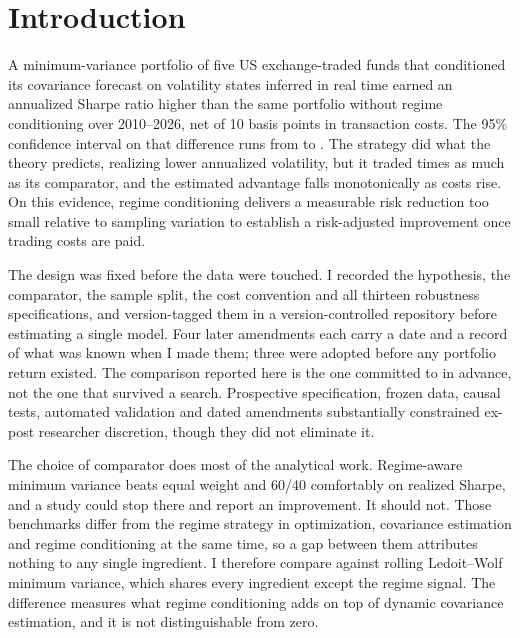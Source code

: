 \section{Introduction}
\label{sec:introduction}

A minimum-variance portfolio of five US exchange-traded funds that
conditioned its covariance forecast on volatility states inferred in
real time earned an annualized Sharpe ratio \primarySharpeDiff{} higher
than the same portfolio without regime conditioning over 2010--2026, net
of 10 basis points in transaction costs. The 95\% confidence interval on
that difference runs from \primaryCiLower{} to \primaryCiUpper{}. The
strategy did what the theory predicts, realizing \volDifferenceMagnitude{}
lower annualized volatility, but it traded \turnoverRatio{} times as much
as its comparator, and the estimated advantage falls monotonically as costs
rise. On this evidence, regime conditioning delivers a measurable risk
reduction too small relative to sampling variation to establish a
risk-adjusted improvement once trading costs are paid.

The design was fixed before the data were touched. I recorded the
hypothesis, the comparator, the sample split, the cost convention and
all thirteen robustness specifications, and version-tagged them in a
version-controlled repository before estimating a single model. Four later
amendments each carry a date and a record of what was known when I made
them; three were adopted before any portfolio return existed. The
comparison reported here is the one committed to in advance, not the one
that survived a search. Prospective specification, frozen data, causal tests,
automated validation and dated amendments substantially constrained
ex-post researcher discretion, though they did not eliminate it.

The choice of comparator does most of the analytical work. Regime-aware
minimum variance beats equal weight and 60/40 comfortably on realized
Sharpe, and a study could stop there and report an improvement. It
should not. Those benchmarks differ from the regime strategy in
optimization, covariance estimation and regime conditioning at the same
time, so a gap between them attributes nothing to any single ingredient.
I therefore compare against rolling Ledoit--Wolf minimum variance, which
shares every ingredient except the regime signal. The \primarySharpeDiff{}
difference measures what regime conditioning adds on top of dynamic
covariance estimation, and it is not distinguishable from zero.

